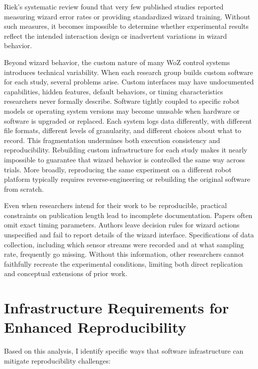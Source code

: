 Riek's systematic review \cite{Riek2012} found that very few published studies reported measuring wizard error rates or providing standardized wizard training. Without such measures, it becomes impossible to determine whether experimental results reflect the intended interaction design or inadvertent variations in wizard behavior.

Beyond wizard behavior, the custom nature of many WoZ control systems introduces technical variability. When each research group builds custom software for each study, several problems arise. Custom interfaces may have undocumented capabilities, hidden features, default behaviors, or timing characteristics researchers never formally describe. Software tightly coupled to specific robot models or operating system versions may become unusable when hardware or software is upgraded or replaced. Each system logs data differently, with different file formats, different levels of granularity, and different choices about what to record. This fragmentation undermines both execution consistency and reproducibility. Rebuilding custom infrastructure for each study makes it nearly impossible to guarantee that wizard behavior is controlled the same way across trials. More broadly, reproducing the same experiment on a different robot platform typically requires reverse-engineering or rebuilding the original software from scratch.

Even when researchers intend for their work to be reproducible, practical constraints on publication length lead to incomplete documentation. Papers often omit exact timing parameters. Authors leave decision rules for wizard actions unspecified and fail to report details of the wizard interface. Specifications of data collection, including which sensor streams were recorded and at what sampling rate, frequently go missing. Without this information, other researchers cannot faithfully recreate the experimental conditions, limiting both direct replication and conceptual extensions of prior work.

\section{Infrastructure Requirements for Enhanced Reproducibility}

Based on this analysis, I identify specific ways that software infrastructure can mitigate reproducibility challenges:

